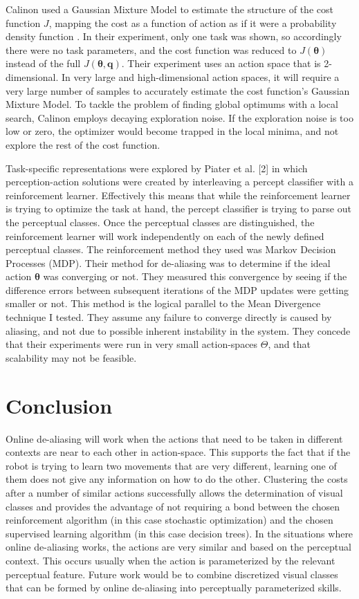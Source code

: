\documentclass[12pt]{article}
\newcommand{\appsp}  {\ensuremath{\Theta}}
\newcommand{\taskp}  {\ensuremath{\mathbf{q}}}
\newcommand{\costf}  {\ensuremath{J}}
\newcommand{\app}    {\ensuremath{\bm{\theta}}}
\begin{document}
Calinon used a Gaussian Mixture Model to estimate the structure of the cost function \costf, mapping the cost as a function of action as if it were a probability density function \cite{calinon}. In their experiment, only one task was shown, so accordingly there were no task parameters, and the cost function was reduced to $\costf(\app)$ instead of the full $\costf(\app,\taskp)$. Their experiment uses an action space that is 2-dimensional. In very large and high-dimensional action spaces, it will require a very large number of samples to accurately estimate the cost function's Gaussian Mixture Model. To tackle the problem of finding global optimums with a local search, Calinon employs decaying exploration noise. If the exploration noise is too low or zero, the optimizer would become trapped in the local minima, and not explore the rest of the cost function.

Task-specific representations were explored by Piater et al. [2] in which perception-action solutions were created by interleaving a percept classifier with a reinforcement learner. Effectively this means that while the reinforcement learner is trying to optimize the task at hand, the percept classifier is trying to parse out the perceptual classes. Once the perceptual classes are distinguished, the reinforcement learner will work independently on each of the newly defined perceptual classes. The reinforcement method they used was Markov Decision Processes (MDP). Their method for de-aliasing was to determine if the ideal action $\app$ was converging or not. They measured this convergence by seeing if the difference errors between subsequent iterations of the MDP updates were getting smaller or not. This method is the logical parallel to the Mean Divergence technique I tested. They assume any failure to converge directly is caused by aliasing, and not due to possible inherent instability in the system. They concede that their experiments were run in very small action-spaces $\appsp$, and that scalability may not be feasible. 


\section{Conclusion}

Online de-aliasing will work when the actions that need to be taken in different contexts are near to each other in action-space. This supports the fact that if the robot is trying to learn two movements that are very different, learning one of them does not give any information on how to do the other. Clustering the costs after a number of similar actions successfully allows the determination of visual classes and provides the advantage of not requiring a bond between the chosen reinforcement algorithm (in this case stochastic optimization) and the chosen supervised learning algorithm (in this case decision trees). In the situations where online de-aliasing works, the actions are very similar and based on the perceptual context. This occurs usually when the action is parameterized by the relevant perceptual feature. Future work would be to combine discretized visual classes that can be formed by online de-aliasing into perceptually parameterized skills.
\end{document}
